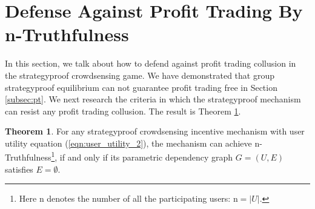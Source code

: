 \documentclass[conference]{IEEEtran}
\theoremstyle{definition}
\newtheorem{theorem}{Theorem}
\begin{document}
\section{Defense Against Profit Trading By n-Truthfulness}
\label{sec:DFPT}
In this section, we talk about how to defend against profit trading collusion in the strategyproof crowdsensing game. We have demonstrated that group strategyproof equilibrium can not guarantee profit trading free in Section \ref{subsec:pt}. We next research the criteria in which the strategyproof mechanism can resist any profit trading collusion. The result is Theorem \ref{thm:pt}.
\begin{theorem}
\label{thm:pt}
For any strategyproof crowdsensing incentive mechanism with user utility equation (\ref{eqn:user_utility_2}), the mechanism can achieve n-Truthfulness\footnote{Here n denotes the number of all the participating users: $\mathrm{n}=|U|$.}, if and only if its parametric dependency graph $G=(U,E)$ satisfies $E=\emptyset$.
\end{theorem}
\end{document}
